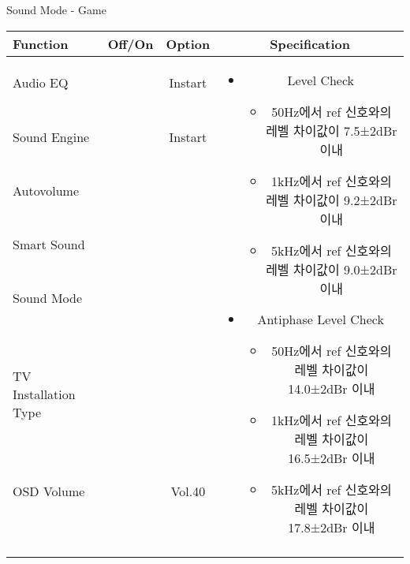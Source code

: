 \begin{frame}[t]{Sound Mode - Game}
\begin{tiny}
\begin{tabular}{@{}lccc@{}}
\toprule
Function & Off/On & Option & Specification \\
\midrule
Audio EQ & \color{black}{Off} & Instart &
\multirow{10}{60mm}{
\begin{itemize}
\item Level Check
  \begin{itemize}
  \item 50Hz에서 ref 신호와의 레벨 차이값이 7.5±2dBr 이내
  \item 1kHz에서 ref 신호와의 레벨 차이값이 9.2±2dBr 이내
  \item 5kHz에서 ref 신호와의 레벨 차이값이 9.0±2dBr 이내
  \end{itemize}
\item Antiphase Level Check
  \begin{itemize}
  \item 50Hz에서 ref 신호와의 레벨 차이값이 14.0±2dBr 이내
  \item 1kHz에서 ref 신호와의 레벨 차이값이 16.5±2dBr 이내
  \item 5kHz에서 ref 신호와의 레벨 차이값이 17.8±2dBr 이내
  \end{itemize}
\end{itemize}
} \\
Sound Engine & \color{blue}{On} & Instart & \\
Autovolume & \color{black}{Off} & & \\
Smart Sound & \color{black}{Off} & & \\
Sound Mode & \color{blue}{On} & \color{blue}{Game} & \\
TV Installation Type & \color{blue}{On} & \color{black}{Standtype1} & \\
OSD Volume & \color{blue}{On} & Vol.40 & \\
& & & \\
& & & \\
& & & \\
& & & \\
\midrule
\end{tabular}
\end{tiny}

\end{frame}

